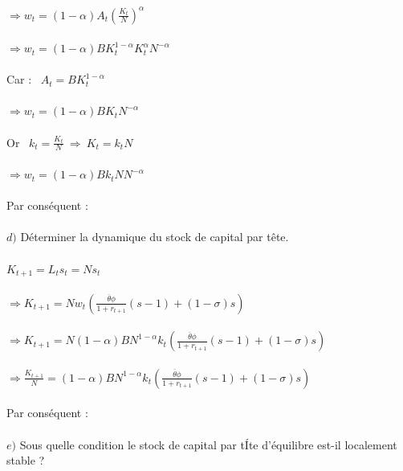 \documentclass[11pt,twoside,a4paper]{article}
\begin{document}
$ \Rightarrow w_t=(1-\alpha)A_t\left(\frac{K_t}{N}\right)^{\alpha}$\\ \\
$ \Rightarrow w_t=(1-\alpha)BK^{1-\alpha}_t K_t^{\alpha}N^{-\alpha}$\\ \\
Car : \ $A_t=BK^{1-\alpha}_t$\\ \\
$ \Rightarrow w_t=(1-\alpha)B K_tN^{-\alpha}$\\ \\
Or \ $k_t=\frac{K_t}{N} \ \Rightarrow \ K_t=k_tN$\\ \\
$ \Rightarrow w_t=(1-\alpha)B k_tNN^{-\alpha}$\\ \\
Par conséquent : \ \\ \\

$d)$ Déterminer la dynamique du stock de capital par t\^{e}te.\\ \\
$K_{t+1}=L_ts_t=Ns_t$\\ \\
$\Rightarrow K_{t+1}=Nw_t\left(\frac{\overline{\theta}\phi}{1+r_{t+1}}(s-1) +(1- \sigma)s \right)$\\ \\
$\Rightarrow K_{t+1}=N(1-\alpha)B N^{1-\alpha}k_t\left(\frac{\overline{\theta}\phi}{1+r_{t+1}}(s-1) +(1- \sigma)s \right)$\\ \\
$\Rightarrow \frac{K_{t+1}}{N}=(1-\alpha)B N^{1-\alpha}k_t\left(\frac{\overline{\theta}\phi}{1+r_{t+1}}(s-1) +(1- \sigma)s \right)$\\ \\
Par conséquent : \ \\ \\
$e)$ Sous quelle condition le stock de capital par tÍte d'équilibre est-il localement stable ?
\end{document}
